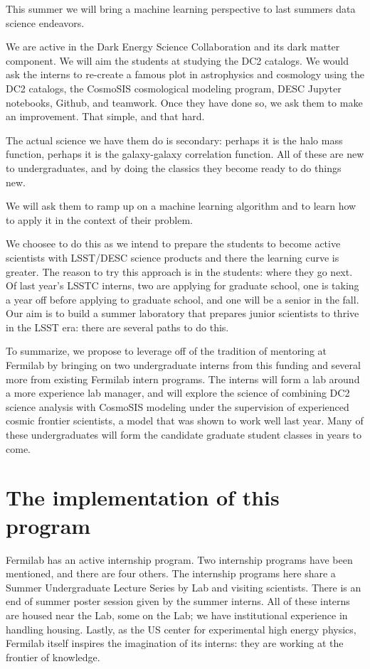 This summer we will bring a machine learning perspective to last summers
data science endeavors. 

\newpage

We are active in the Dark Energy Science Collaboration and its dark matter component.
We will aim the students at studying the DC2 catalogs. We would ask
the interns to re-create a famous plot in astrophysics and cosmology using
the DC2 catalogs, the CosmoSIS cosmological modeling program,
DESC Jupyter notebooks, Github, and teamwork. Once they have done so,
we ask them to make an improvement. That simple, and that hard.

The actual science we have them do is secondary: perhaps it is the
halo mass function, perhaps it is the galaxy-galaxy correlation function.
All of these are new to undergraduates, and by doing the classics they
become ready to do things new.

We will ask them to ramp up on a machine learning algorithm and
to learn how to apply it in the context of their problem.

We choosee to do this
as we intend to prepare the students to become active scientists
with LSST/DESC science products and there the learning curve is greater.
The reason to try this approach is in the students: where they go next.
Of last year's LSSTC interns, two are applying for graduate school,
one is taking a year off before applying to graduate school, and one
will be a senior in the fall.
Our aim is to build a summer laboratory 
that prepares junior scientists to thrive in the LSST era: there
are several paths to do this. 

To summarize, we  propose to leverage off of the tradition 
of mentoring at Fermilab by
bringing on two undergraduate interns from this funding
and several more from existing Fermilab intern programs.
The interns will form a lab around a more experience
lab manager, and will explore the science
of combining DC2 science analysis with CosmoSIS modeling
under the supervision of experienced cosmic
frontier scientists, a model that was shown to work
well last year. Many of these  undergraduates will
form the candidate graduate student classes in years to come.

\newpage
\section{The implementation of this program}

Fermilab has an active internship program. Two internship programs
have been mentioned, and there are four others. The internship
programs here share a Summer Undergraduate Lecture Series by
Lab and visiting scientists. There is an end of summer poster
session given by the summer interns. All of these interns
are housed near the Lab, some on the Lab; we have institutional
experience in handling housing. Lastly, as the US center for
experimental high energy physics, Fermilab itself inspires
the imagination of its interns: they are working at the frontier
of knowledge.

